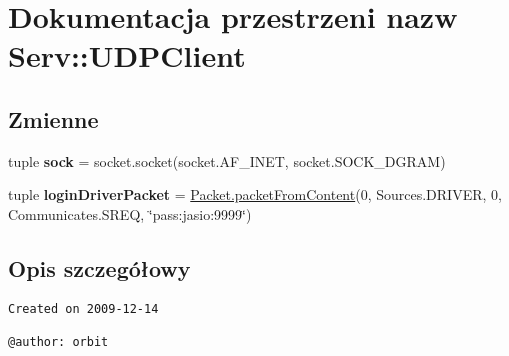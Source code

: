 \hypertarget{namespace_serv_1_1_u_d_p_client}{
\section{Dokumentacja przestrzeni nazw Serv::UDPClient}
\label{namespace_serv_1_1_u_d_p_client}
}
\subsection*{Zmienne}
\begin{CompactItemize}
\item 
\hypertarget{namespace_serv_1_1_u_d_p_client_26010463e2557dd99ea69558ac84b513}{
tuple \textbf{sock} = socket.socket(socket.AF\_\-INET, socket.SOCK\_\-DGRAM)}
\label{namespace_serv_1_1_u_d_p_client_26010463e2557dd99ea69558ac84b513}

\item 
\hypertarget{namespace_serv_1_1_u_d_p_client_6a7c093d00705f1a7a45121724849c7a}{
tuple \textbf{loginDriverPacket} = \hyperlink{class_serv_1_1_packet_1_1_packet_145ac89df7bc66728e8b3e642650aff4}{Packet.packetFromContent}(0, Sources.DRIVER, 0, Communicates.SREQ, \char`\"{}pass:jasio:9999\char`\"{})}
\label{namespace_serv_1_1_u_d_p_client_6a7c093d00705f1a7a45121724849c7a}

\end{CompactItemize}


\subsection{Opis szczegółowy}


\footnotesize\begin{verbatim}
Created on 2009-12-14

@author: orbit
\end{verbatim}
\normalsize
 


